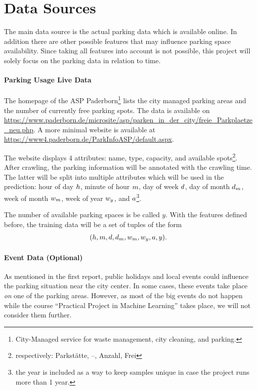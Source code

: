 
\section{Data Sources}\label{data sources}
The main data source is the actual parking data which is available online. In addition there are other possible features that may influence parking space availability. Since taking all features into account is not possible, this project will solely focus on the parking data in relation to time. 

\paragraph{Parking Usage Live Data}
The homepage of the ASP Paderborn\footnote{City-Managed service for waste management, city cleaning, and parking.} lists the city managed parking areas and the number of currently free parking spots. 
The data is available on \url{https://www.paderborn.de/microsite/asp/parken_in_der_city/freie_Parkplaetze_neu.php}. A more minimal website is available at \url{https://www4.paderborn.de/ParkInfoASP/default.aspx}. 

The website displays 4 attributes: name, type, capacity, and available spots\footnote{respectively: Parkstätte, --, Anzahl, Frei}. After crawling, the parking information will be annotated with the crawling time. The latter will be split into multiple attributes which will be used in the prediction: hour of day \(h\), minute of hour \(m\), day of week \(d\), day of month \(d_m\), week of month \(w_m\), week of year \(w_y\), and \(a\)\footnote{the year is included as a way to keep samples unique in case the project runs more than 1 year.}.

The number of available parking spaces is be called \(y\). With the features defined before, the training data will be a set of tuples of the form  
\[
(h, m, d, d_m, w_m, w_y, a, y)\text{.}
\]

\paragraph{Event Data (Optional)}
As mentioned in the first report, public holidays and local events could influence the parking situation near the city center. In some cases, these events take place \textit{on} one of the parking areas. However, as most of the big events do not happen while the course ``Practical Project in Machine Learning'' takes place, we will not consider them further.

